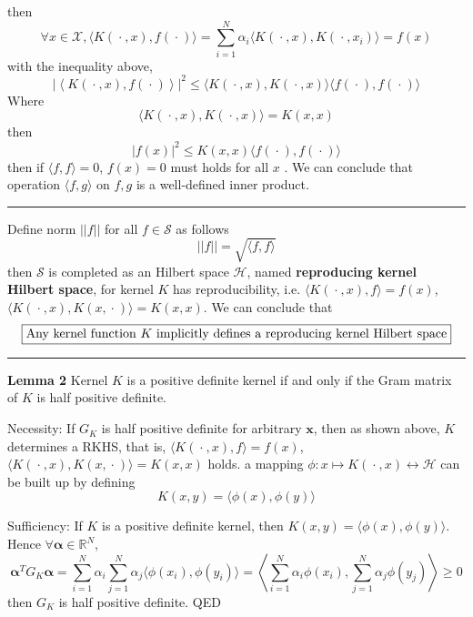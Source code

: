 \documentclass[12pt]{article}
\newcommand{\bdot}{~\bm{\cdot}~}
\newcommand{\la}{\langle}
\newcommand{\ra}{\rangle}
\begin{document}
then
\begin{equation}
    \forall x \in \mathcal{X}, \la K(\bdot, x), f(\bdot)\ra = \sum_{i=1}^N \alpha_i \la K(\bdot, x), K(\bdot, x_i) \ra= f(x) 
\end{equation}
with the inequality above,
\begin{equation}
    |\left\la K(\bdot, x), f(\bdot)\right\ra|^2 \leq \la K(\bdot, x), K(\bdot, x) \ra \la f(\bdot), f(\bdot) \ra
\end{equation}
Where
\begin{equation}
    \la K(\bdot, x), K(\bdot, x) \ra = K(x, x)
\end{equation}
then
\begin{equation}
    |f(x)|^2 \leq K(x, x) \la f(\bdot), f(\bdot) \ra
\end{equation}
then if $\la f,f \ra = 0$, $f(x) = 0$ must holds for all $x$
. We can conclude that operation $\la f, g \ra $ on $f, g$ is a well-defined inner product. \par \noindent
\rule[-0em]{\linewidth}{0.07em}
Define norm $||f||$ for all $f \in \mathcal{S}$ as follows
\begin{equation}
    ||f|| = \sqrt{\la f, f \ra}
\end{equation}
then $\mathcal{S}$ is completed as an Hilbert space $\mathcal{H}$, named \textbf{reproducing kernel Hilbert space}, for kernel $K$ has reproducibility, i.e. $\la K(\bdot, x), f \ra = f(x)$, $\la K(\bdot, x), K(x, \bdot) \ra = K(x, x)$. We can conclude that
\begin{equation}
    \boxed{\text{Any kernel function $K$ implicitly defines a reproducing kernel Hilbert space}} \notag
\end{equation}
\rule[0em]{\linewidth}{0.07em}
\textbf{Lemma 2} Kernel $K$ is a positive definite kernel if and only if the Gram matrix of $K$ is half positive definite. \par Necessity: If $G_K$ is half positive definite for arbitrary $\bm{x}$, then as shown above, $K$ determines a RKHS, that is, $\la K(\bdot, x), f \ra = f(x)$, $\la K(\bdot, x), K(x, \bdot) \ra = K(x, x)$ holds. a mapping $\phi: x \mapsto K(\bdot, x) \leftrightarrow \mathcal{H}$ can be built up by defining
\begin{equation}
    K(x, y) = \la \phi(x), \phi(y) \ra
\end{equation} \par
Sufficiency: If $K$ is a positive definite kernel, then $K(x, y) = \la \phi(x), \phi(y) \ra$. Hence $\forall \bm{\alpha} \in \mathbb{R}^N$,
\begin{equation}
    \bm{\alpha}^T G_{K} \bm{\alpha} = \sum_{i=1}^N \alpha_i \sum_{j=1}^N \alpha_j \la \phi(x_i), \phi(y_i) \ra = \left\la \sum_{i=1}^N \alpha_i \phi(x_i) , \sum_{j=1}^N \alpha_j \phi(y_j) \right\ra \geq 0
\end{equation}
then $G_K$ is half positive definite. QED
\end{document}
